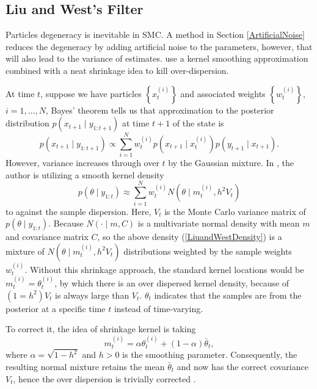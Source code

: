 


\subsection{Liu and West's Filter}

Particles degeneracy is inevitable in SMC. A method in Section \ref{ArtificialNoise} reduces the degeneracy by adding artificial noise to the parameters, however, that will also lead to the variance of estimates. \cite{liu2001combined} use a kernel smoothing approximation combined with a neat shrinkage idea to kill over-dispersion. 

At time $t$, suppose we have particles $\left\lbrace x_t^{(i)}\right\rbrace$ and associated weights $\left\lbrace w_t^{(i)}\right\rbrace$, $i=1,\ldots,N$, Bayes' theorem tells us that approximation to the posterior distribution $p(x_{t+1}\mid y_{1:t+1})$ at time $t+1$ of the state is 
\begin{equation*}
p(x_{t+1} \mid y_{1:t+1}) \propto \sum_{i=1}^{N} w_t^{(i)} p\left(x_{t+1} \mid x_t^{(i)}\right)p\left(y_{t+1}\mid x_{t+1}\right).
\end{equation*}
However, variance increases through over $t$ by the Gaussian mixture. In \citep{west1993mixture}, the author is utilizing a smooth kernel density 
\begin{equation}\label{LiuandWestDensity}
p(\theta\mid y_{1:t})\approx \sum_{i=1}^{N}w_t^{(i)} N\left(\theta\mid m_t^{(i)},h^2V_t\right)
\end{equation}
to against the sample dispersion. Here, $V_t$ is the Monte Carlo variance matrix of $p(\theta\mid y_{1:t})$. Because $N(\cdot\mid m,C)$ is a multivariate normal density with mean $m$ and covariance matrix $C$, so the above density (\ref{LiuandWestDensity}) is a mixture of $N\left(\theta\mid m_t^{(i)},h^2V_t\right)$ distributions weighted by the sample weights $w_t^{(i)}$. Without this shrinkage approach, the standard kernel locations would be $m_t^{(i)}=\theta_t^{(i)}$, by which there is an over dispersed kernel density, because of $(1=h^2)V_t$ is always large than $V_t$. $\theta_t$ indicates that the samples are from the posterior at a specific time $t$ instead of time-varying. 

To correct it, the idea of shrinkage kernel is taking 
\begin{equation}
m_t^{(i)}=\alpha \theta_t^{(i)} + (1-\alpha)\bar{\theta}_t,
\end{equation}
where $\alpha=\sqrt{1-h^2}$ and $h>0$ is the smoothing parameter.
Consequently, the resulting normal mixture retains the mean $\bar{\theta}_t$ and now has the correct covariance $V_t$, hence the over dispersion is trivially corrected \citep{liu2001combined}. 

